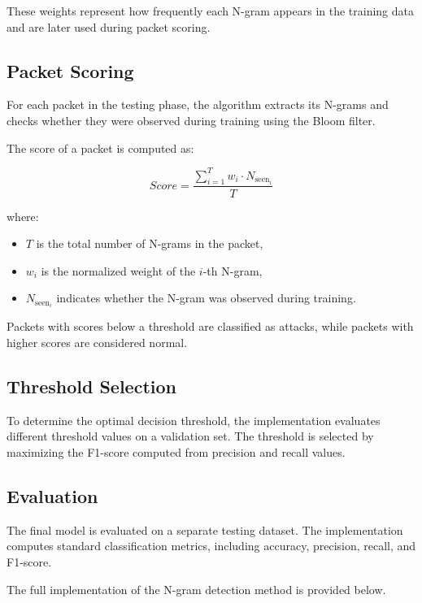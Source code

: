 These weights represent how frequently each N-gram appears in the training data and are later used during packet scoring.

\subsection{Packet Scoring}

For each packet in the testing phase, the algorithm extracts its N-grams and checks whether they were observed during training using the Bloom filter.

The score of a packet is computed as:

\[
Score = \frac{\sum_{i=1}^{T} w_i \cdot N_{\text{seen}_i}}{T}
\]

where:

\begin{itemize}
\item $T$ is the total number of N-grams in the packet,
\item $w_i$ is the normalized weight of the $i$-th N-gram,
\item $N_{\text{seen}_i}$ indicates whether the N-gram was observed during training.
\end{itemize}

Packets with scores below a threshold are classified as attacks, while packets with higher scores are considered normal.

\subsection{Threshold Selection}

To determine the optimal decision threshold, the implementation evaluates different threshold values on a validation set. The threshold is selected by maximizing the F1-score computed from precision and recall values.

\subsection{Evaluation}

The final model is evaluated on a separate testing dataset. The implementation computes standard classification metrics, including accuracy, precision, recall, and F1-score.

The full implementation of the N-gram detection method is provided below.

